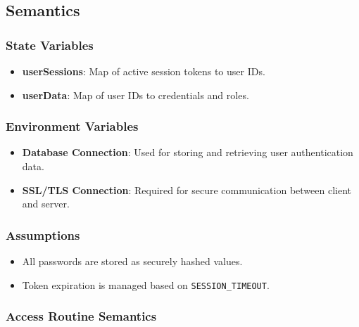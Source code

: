 \documentclass[12pt, titlepage]{article}
\begin{document}
\subsection{Semantics}

\subsubsection{State Variables}

\begin{itemize}
    \item \textbf{userSessions}: Map of active session tokens to user IDs.
    \item \textbf{userData}: Map of user IDs to credentials and roles.
\end{itemize}

\subsubsection{Environment Variables}

\begin{itemize}
    \item \textbf{Database Connection}: Used for storing and retrieving user authentication data.
    \item \textbf{SSL/TLS Connection}: Required for secure communication between client and server.
\end{itemize}

\subsubsection{Assumptions}

\begin{itemize}
    \item All passwords are stored as securely hashed values.
    \item Token expiration is managed based on \texttt{SESSION\_TIMEOUT}.
\end{itemize}

\subsubsection{Access Routine Semantics}
\end{document}
